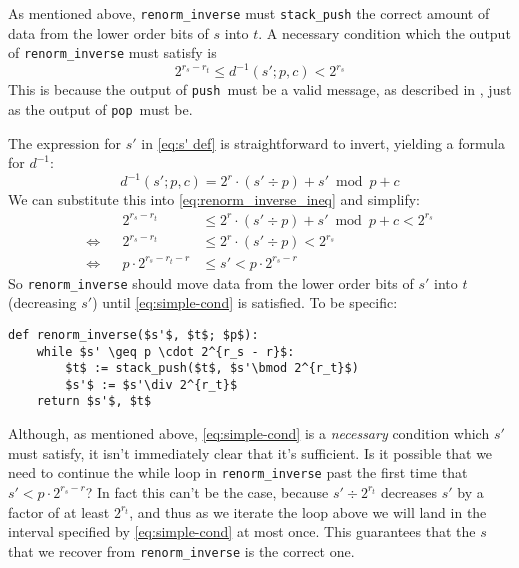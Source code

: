 \documentclass{article}
\theoremstyle{definition}
\newcommand{\push}{\texttt{push}}
\newcommand{\pop}{\texttt{pop}}
\begin{document}
As mentioned above, \texttt{renorm\_inverse} must \texttt{stack\_push} the
correct amount of data from the lower order bits of \(s\) into \(t\). A
necessary condition which the output of \texttt{renorm\_inverse} must satisfy
is
\begin{equation}\label{eq:renorm_inverse_ineq}
  2^{r_s - r_t} \leq d^{-1}(s'; p, c) < 2^{r_s}
\end{equation}
This is because the output of \push\ must be a valid message, as described in
, just as the output of \pop\ must be.

The expression for \(s'\) in \cref{eq:s' def} is straightforward to invert,
yielding a formula for
\(d^{-1}\):
\begin{equation}
  d^{-1}(s'; p, c) = 2^{r} \cdot (s' \div p) + s' \bmod p + c
\end{equation}
We can substitute this into \cref{eq:renorm_inverse_ineq} and simplify:
\begin{align}
      &&2^{r_s - r_t}            &\leq 2^{r} \cdot (s' \div p) + s' \bmod p + c < 2^{r_s}\\
  \iff&&2^{r_s - r_t}            &\leq 2^{r} \cdot (s' \div p) < 2^{r_s}\\
  \iff&&p\cdot2^{r_s - r_t - r}&\leq s' < p\cdot 2^{r_s - r}\label{eq:simple-cond}
\end{align}
So \texttt{renorm\_inverse} should move data from the lower order bits of
\(s'\) into \(t\) (decreasing \(s'\)) until \cref{eq:simple-cond} is satisfied.
To be specific:

\begin{lstlisting}[frame=single]
def renorm_inverse($s'$, $t$; $p$):
    while $s' \geq p \cdot 2^{r_s - r}$:
        $t$ := stack_push($t$, $s'\bmod 2^{r_t}$)
        $s'$ := $s'\div 2^{r_t}$
    return $s'$, $t$
\end{lstlisting}

Although, as mentioned above, \cref{eq:simple-cond} is a \emph{necessary}
condition which \(s'\) must satisfy, it isn't immediately clear that it's
sufficient. Is it possible that we need to continue the while loop in
\texttt{renorm\_inverse} past the first time that \(s'<p\cdot2^{r_s - r}\)? In
fact this can't be the case, because \(s'\div2^{r_t}\) decreases \(s'\) by a
factor of at least \(2^{r_t}\), and thus as we iterate the loop above we will
land in the interval specified by \cref{eq:simple-cond} at most once. This
guarantees that the \(s\) that we recover from \texttt{renorm\_inverse} is the
correct one.
\end{document}
